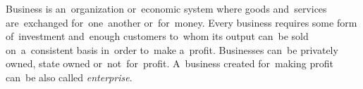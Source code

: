 \label{business}
Business is an~organization or~economic system where goods and~services are~exchanged for~one~another or~for~money.
Every business requires some form of~investment and~enough customers to~whom its output can~be sold on~a~consistent basis in~order to~make a~profit.
Businesses can~be privately owned, state owned or~not~for~profit.
A~business created for~making profit can~be also called \textit{enterprise}.

